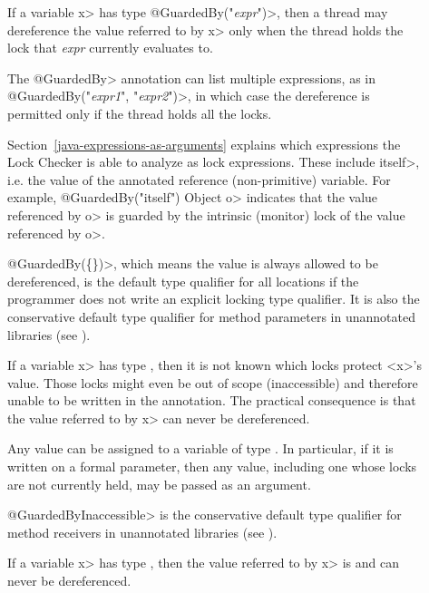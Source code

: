 \begin{description}

\item[]
  If a variable \<x> has type \<@GuardedBy("\emph{expr}")>, then a thread may
  dereference the value referred to by \<x> only when the thread holds the
  lock that \emph{expr} currently evaluates to.

  The \<@GuardedBy> annotation can list multiple expressions, as in
  \<@GuardedBy(\ttlcb"\emph{expr1}", "\emph{expr2}"\ttrcb)>, in which case
  the dereference is
  permitted only if the thread holds all the locks.

  Section~\ref{java-expressions-as-arguments} explains which
  expressions the Lock Checker is able to analyze as lock expressions.
  These include \<itself>, i.e. the value of the annotated reference
  (non-primitive) variable.  For example, \<@GuardedBy("itself") Object o>
  indicates that the value referenced by \<o> is guarded by the intrinsic
  (monitor) lock of the value referenced by \<o>.

  \<@GuardedBy(\{\})>, which means the value is always allowed to be
  dereferenced, is the default type qualifier for all locations
  if the programmer does not
  write an explicit locking type qualifier.  It is also the conservative
  default type qualifier for method parameters in unannotated libraries
  (see ).

\item[]
  If a variable \<x> has type , then
  it is not known which locks protect <x>'s value.  Those locks might
  even be out of scope (inaccessible) and therefore unable to be written
  in the annotation.
  The practical consequence is that
  the value referred to by \<x> can never be dereferenced.

  Any value can be assigned to a variable of type
  .  In particular, if it is written on a
  formal parameter, then any value,
  including one whose locks are not currently held,
  may be passed as an argument.

  \<@GuardedByInaccessible> is the conservative
  default type qualifier for method receivers in unannotated libraries
  (see ).

\item[]
  If a variable \<x> has type , then
  the value referred to by \<x> is  and can never
  be dereferenced.

\end{description}

